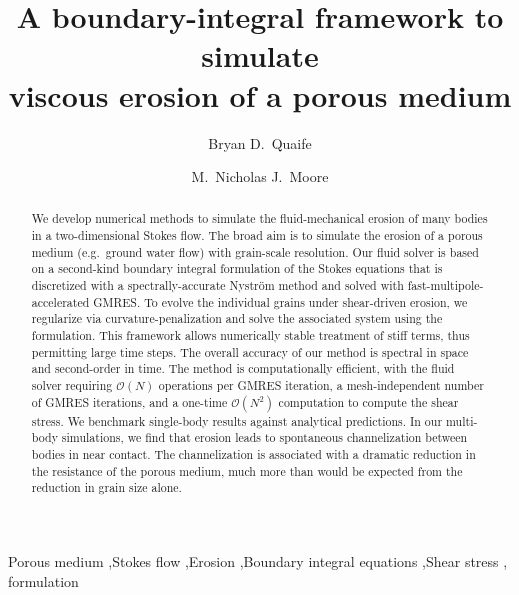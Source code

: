 \documentclass[preprint, 10pt]{elsarticle}
\begin{document}
\title{A boundary-integral framework to simulate \\ viscous erosion of a porous medium}



\author[Bryan]{Bryan D.~Quaife}
\author[Nick]{M.~Nicholas J.~Moore}
\address[Nick]{Department of Mathematics and Geophysical Fluid Dynamics Institute, Florida State University, Tallahassee, FL, 32306.}
\address[Bryan]{Department of Scientific Computing and Geophysical Fluid Dynamics Institute, Florida State University, Tallahassee, FL, 32306.}

\begin{abstract} 
We develop numerical methods to simulate the fluid-mechanical erosion of many bodies in a two-dimensional Stokes flow. The broad aim is to simulate the erosion of a porous medium (e.g.~ground water flow) with grain-scale resolution. Our fluid solver is based on a second-kind boundary integral formulation of the Stokes equations that is discretized with a spectrally-accurate Nystr\"om method and solved with fast-multipole-accelerated GMRES. To evolve the individual grains under shear-driven erosion, we regularize via curvature-penalization and solve the associated system using the {\thL} formulation. This framework allows numerically stable treatment of stiff terms, thus permitting large time steps. The overall accuracy of our method is spectral in space and second-order in time. The method is computationally efficient, with the fluid solver requiring $\mathcal{O}(N)$ operations per GMRES iteration, a mesh-independent number of GMRES iterations, and a one-time $\mathcal{O}(N^2)$ computation to compute the shear stress. We benchmark single-body results against analytical predictions. In our multi-body simulations, we find that erosion leads to spontaneous channelization between bodies in near contact. The channelization is associated with a dramatic reduction in the resistance of the porous medium, much more than would be expected from the reduction in grain size alone.
\end{abstract}

\begin{keyword}
  Porous medium \sep Stokes flow \sep Erosion \sep Boundary integral
  equations \sep Shear stress \sep {\thL} formulation
\end{keyword}
\end{document}
